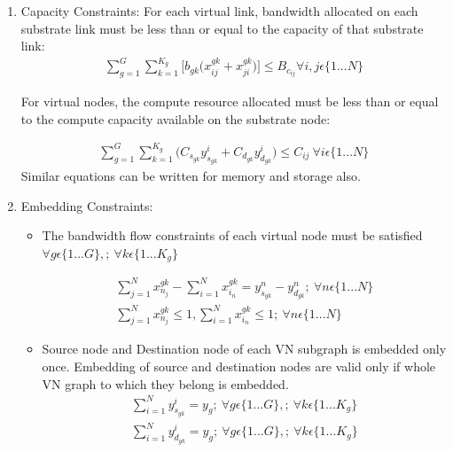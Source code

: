 \documentclass[article,dr=phil,type=msc ,colorback,accentcolor=tud4b]{tudthesis}
\begin{document}
\begin{enumerate}[label=(\Alph*)]
\begin{enumerate}
		\item  Capacity Constraints: For each virtual link, bandwidth allocated on each substrate link must be less than or equal to the capacity of that substrate link:
		\begin{equation}\label{edwin_cap_cons}
		\begin{aligned}
		\sum_{g=1}^{G} \sum_{k=1}^{K_{g}} \big[ b_{gk} \big( x^{gk}_{ij} + x^{gk}_{ji} \big) \big] \leq B_{c_{ij}}  \forall i, j \epsilon\{1...N\}
		\end{aligned}
		\end{equation} 
		
		For virtual nodes, the compute resource allocated must be less than or equal to the compute capacity available on the substrate node:
		
		\begin{equation}
		\begin{aligned}
		\sum_{g=1}^{G} \sum_{k=1}^{K_{g}} \big( C_{s_{gk}} y^{i}_{s_{gk}} +  C_{d_{gk}} y^{i}_{d_{gk}} \big) \leq C_{ij} \ \forall i \epsilon\{1...N\}
		\end{aligned}
		\end{equation}
Similar equations can be written for memory and storage also.
\item Embedding Constraints: 
\begin{itemize}
			\item The bandwidth flow constraints of each virtual node must be satisfied $ \forall g \epsilon \{1...G\}, ;\ \forall k \epsilon \{1...K_{g}\}$
			
			\begin{equation}\label{edwin_emb_cons}
			\begin{split}
			\sum_{j=1}^{N}  x^{gk}_{n_{j}} - \sum_{i=1}^{N} x^{gk}_{i_{n}} =  y^{n}_{s_{gk}} -  y^{n}_{d_{gk}} ;\ \forall n \epsilon\{1...N\}\\
			\sum_{j=1}^{N}  x^{gk}_{n_{j}} \leq 1, \sum_{i=1}^{N} x^{gk}_{i_{n}} \leq 1 ;\ \forall n \epsilon\{1...N\}
			\end{split}
			\end{equation} 
			
			
			\item  Source node and Destination node of each VN subgraph is embedded only once. Embedding of source and destination nodes are valid only if whole VN graph to which they belong is embedded.
			\begin{equation}
			\begin{split}
			\sum_{i=1}^{N} y^{i}_{s_{gk}} = y_{g} ;\ \forall g \epsilon \{1...G\}, ;\ \forall k \epsilon \{1...K_{g}\}\\
			\sum_{i=1}^{N} y^{i}_{d_{gk}} = y_{g} ;\ \forall g \epsilon \{1...G\}, ;\ \forall k \epsilon \{1...K_{g}\}
			\end{split}
			\end{equation} 
			

\end{itemize}
\end{enumerate}
\end{enumerate}
\end{document}
